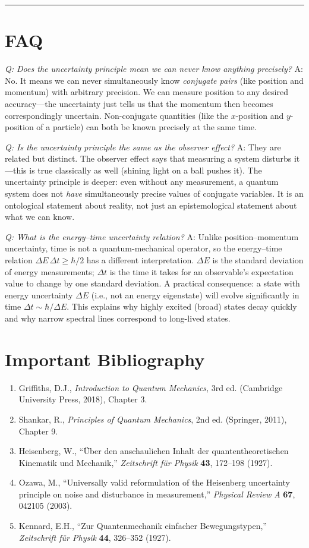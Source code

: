 \bigskip
\hrule
\bigskip
\section*{FAQ}

\textit{Q: Does the uncertainty principle mean we can never know anything precisely?}
A: No. It means we can never simultaneously know \emph{conjugate pairs} (like position and momentum) with arbitrary precision. We can measure position to any desired accuracy---the uncertainty just tells us that the momentum then becomes correspondingly uncertain. Non-conjugate quantities (like the $x$-position and $y$-position of a particle) can both be known precisely at the same time.

\textit{Q: Is the uncertainty principle the same as the observer effect?}
A: They are related but distinct. The observer effect says that measuring a system disturbs it---this is true classically as well (shining light on a ball pushes it). The uncertainty principle is deeper: even without any measurement, a quantum system does not \emph{have} simultaneously precise values of conjugate variables. It is an ontological statement about reality, not just an epistemological statement about what we can know.

\textit{Q: What is the energy--time uncertainty relation?}
A: Unlike position--momentum uncertainty, time is not a quantum-mechanical operator, so the energy--time relation $\Delta E\,\Delta t \geq \hbar/2$ has a different interpretation. $\Delta E$ is the standard deviation of energy measurements; $\Delta t$ is the time it takes for an observable's expectation value to change by one standard deviation. A practical consequence: a state with energy uncertainty $\Delta E$ (i.e., not an energy eigenstate) will evolve significantly in time $\Delta t \sim \hbar/\Delta E$. This explains why highly excited (broad) states decay quickly and why narrow spectral lines correspond to long-lived states.
\section*{Important Bibliography}
\begin{enumerate}
\item Griffiths, D.J., \textit{Introduction to Quantum Mechanics}, 3rd ed. (Cambridge University Press, 2018), Chapter 3.
\item Shankar, R., \textit{Principles of Quantum Mechanics}, 2nd ed. (Springer, 2011), Chapter 9.
\item Heisenberg, W., ``Über den anschaulichen Inhalt der quantentheoretischen Kinematik und Mechanik,'' \textit{Zeitschrift für Physik} \textbf{43}, 172--198 (1927).
\item Ozawa, M., ``Universally valid reformulation of the Heisenberg uncertainty principle on noise and disturbance in measurement,'' \textit{Physical Review A} \textbf{67}, 042105 (2003).
\item Kennard, E.H., ``Zur Quantenmechanik einfacher Bewegungstypen,'' \textit{Zeitschrift für Physik} \textbf{44}, 326--352 (1927).
\end{enumerate}


